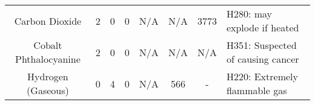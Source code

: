 \begin{landscape}
\begin{table}[]
\begin{tabular}{@{}cccccccl@{}}
Carbon Dioxide                                                                            & 2                                       & 0                                             & 0                                           & N/A                                                                                   & N/A                                                                                                     & 3773                                                                                                  & H280: may explode if heated                                                                                                                                                                                                                                                                                                                   \\
Cobalt Phthalocyanine                                                                     & 2                                       & 0                                             & 0                                           & N/A                                                                                   & N/A                                                                                                     & N/A                                                                                                   & H351: Suspected of causing cancer                                                                                                                                                                                                                                                                                                             \\
Hydrogen (Gaseous)                                                                        & 0                                       & 4                                             & 0                                           & N/A                                                                                   & 566                                                                                                     & -                                                                                                     & H220: Extremely flammable gas                                                                                                                                                                                                                                                                                                                 \\

\end{tabular}
\end{table}
\end{landscape}
